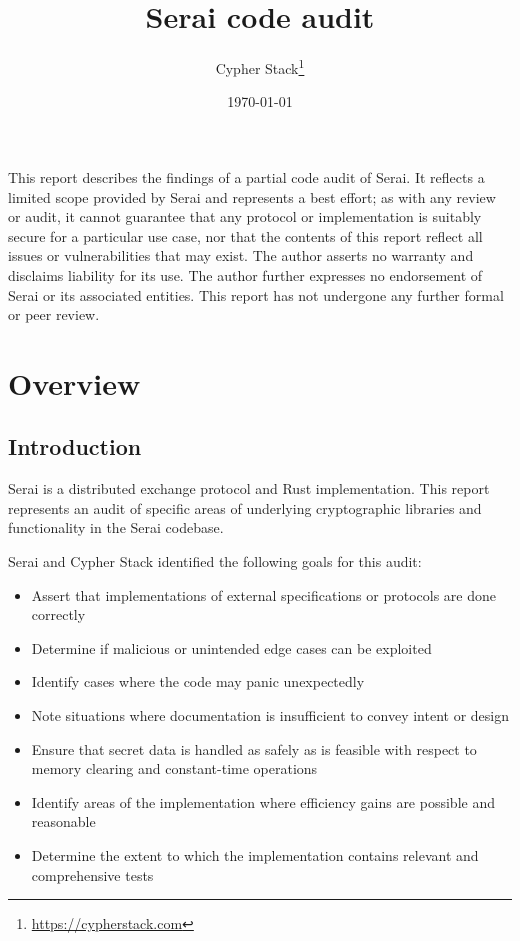 \documentclass{article}
\title{Serai code audit}
\author{Cypher Stack\thanks{\url{https://cypherstack.com}}}
\date{\today}
\begin{document}
\maketitle

This report describes the findings of a partial code audit of Serai.
It reflects a limited scope provided by Serai and represents a best effort; as with any review or audit, it cannot guarantee that any protocol or implementation is suitably secure for a particular use case, nor that the contents of this report reflect all issues or vulnerabilities that may exist.
The author asserts no warranty and disclaims liability for its use.
The author further expresses no endorsement of Serai or its associated entities.
This report has not undergone any further formal or peer review.


\tableofcontents


\section{Overview}


\subsection{Introduction}

Serai is a distributed exchange protocol and Rust implementation.
This report represents an audit of specific areas of underlying cryptographic libraries and functionality in the Serai codebase.

Serai and Cypher Stack identified the following goals for this audit:
\begin{itemize}
\item Assert that implementations of external specifications or protocols are done correctly
\item Determine if malicious or unintended edge cases can be exploited
\item Identify cases where the code may panic unexpectedly
\item Note situations where documentation is insufficient to convey intent or design
\item Ensure that secret data is handled as safely as is feasible with respect to memory clearing and constant-time operations
\item Identify areas of the implementation where efficiency gains are possible and reasonable
\item Determine the extent to which the implementation contains relevant and comprehensive tests
\end{itemize}
\end{document}
